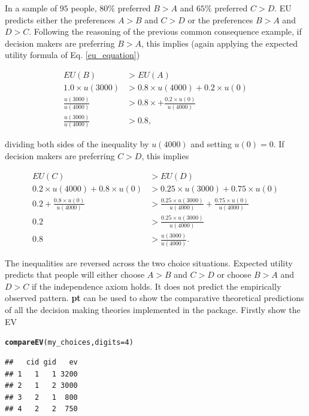 \documentclass{article}\usepackage[]{graphicx}\usepackage[]{color}
\makeatletter
\newcommand{\hlnum}[1]{\textcolor[rgb]{0.686,0.059,0.569}{#1}}%
\newcommand{\hlstd}[1]{\textcolor[rgb]{0.345,0.345,0.345}{#1}}%
\newcommand{\hlkwc}[1]{\textcolor[rgb]{0.333,0.667,0.333}{#1}}%
\newcommand{\hlkwd}[1]{\textcolor[rgb]{0.737,0.353,0.396}{\textbf{#1}}}%
\newenvironment{kframe}{%
 \def\at@end@of@kframe{}%
 \ifinner\ifhmode%
  \def\at@end@of@kframe{\end{minipage}}%
  \begin{minipage}{\columnwidth}%
 \fi\fi%
 \def\FrameCommand##1{\hskip\@totalleftmargin \hskip-\fboxsep
 \colorbox{shadecolor}{##1}\hskip-\fboxsep
     \hskip-\linewidth \hskip-\@totalleftmargin \hskip\columnwidth}%
 \MakeFramed {\advance\hsize-\width
   \@totalleftmargin\z@ \linewidth\hsize
   \@setminipage}}%
 {\par\unskip\endMakeFramed%
 \at@end@of@kframe}
\newenvironment{knitrout}{}{} %
\makeatother
\begin{document}
In a sample of $95$ people, $80\%$ preferred $B > A$ and $65\%$ preferred $C > D$.
EU predicts either the preferences $A > B$ and $C > D$ or the preferences $B > A$ and $D > C$.
Following the reasoning of the previous common consequence example,
if decision makers are preferring $B > A$, this implies (again applying the expected utility formula of Eq. \eqref{eu_equation})

\begin{equation}
\begin{split}
EU(B) &> EU(A)\\
1.0 \times u(3000) &> 0.8 \times u(4000) + 0.2 \times u(0)\\
\frac{u(3000)}{u(4000)} &> 0.8 \times + \frac{0.2 \times u(0)}{u(4000)}\\
\frac{u(3000)}{u(4000)} &> 0.8,
\end{split}
\end{equation}

dividing both sides of the inequality by $u(4000)$ and setting $u(0) = 0$. If decision makers are preferring $C > D$, this implies

\begin{equation}
\begin{split}
EU(C) &> EU(D)\\
0.2 \times u(4000) + 0.8 \times u(0) &> 0.25 \times u(3000) + 0.75 \times u(0)\\
0.2 + \frac{0.8 \times u(0)}{u(4000)} &> \frac{0.25 \times u(3000)}{u(4000)} + \frac{0.75 \times u(0)}{u(4000)}\\
0.2 &> \frac{0.25 \times u(3000)}{u(4000)}\\
0.8 &> \frac{u(3000)}{u(4000)}.
\end{split}
\end{equation}

The inequalities are reversed across the two choice situations. Expected utility predicts that people will either choose $A > B$ and $C > D$ or choose $B > A$ and $D > C$ if the independence axiom holds. It does not predict the empirically observed pattern. {\bf pt} can be used to show the comparative theoretical predictions of all the decision making theories implemented in the package. Firstly show the EV

\begin{knitrout}
\color{fgcolor}\begin{kframe}
\begin{alltt}
\hlkwd{compareEV}\hlstd{(my_choices,} \hlkwc{digits}\hlstd{=}\hlnum{4}\hlstd{)}
\end{alltt}
\begin{verbatim}
##   cid gid   ev
## 1   1   1 3200
## 2   1   2 3000
## 3   2   1  800
## 4   2   2  750
\end{verbatim}
\end{kframe}
\end{knitrout}
\end{document}
